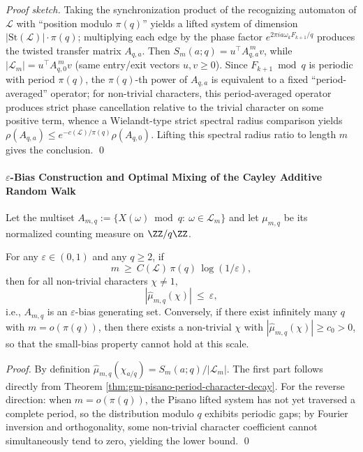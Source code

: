 \begin{proof}[Proof sketch]
Taking the synchronization product of the recognizing automaton of \(\mathcal{L}\) with ``position modulo \(\pi(q)\)'' yields a lifted system of dimension \(|\mathrm{St}(\mathcal{L})|\cdot\pi(q)\); multiplying each edge by the phase factor \(e^{2\pi i a\omega_k F_{k+1}/q}\) produces the twisted transfer matrix \(A_{q,a}\).
Then \(S_m(a;q)=u^\top A_{q,a}^{\,m}v\), while \(|\mathcal{L}_m|=u^\top A_{q,0}^{\,m}v\) (same entry/exit vectors \(u,v\ge 0\)).
Since \(F_{k+1}\bmod q\) is periodic with period \(\pi(q)\), the \(\pi(q)\)-th power of \(A_{q,a}\) is equivalent to a fixed ``period-averaged'' operator; for non-trivial characters, this period-averaged operator produces strict phase cancellation relative to the trivial character on some positive term, whence a Wielandt-type strict spectral radius comparison yields
\(
\rho(A_{q,a})\le e^{-c(\mathcal{L})/\pi(q)}\rho(A_{q,0})
\).
Lifting this spectral radius ratio to length \(m\) gives the conclusion. \qed
\end{proof}

\paragraph{\texorpdfstring{$\varepsilon$}{epsilon}-Bias Construction and Optimal Mixing of the Cayley Additive Random Walk}
Let the multiset
\(
A_{m,q}:=\{X(\omega)\bmod q:\ \omega\in\mathcal{L}_m\}
\)
and let \(\mu_{m,q}\) be its normalized counting measure on \(\ZZ/q\ZZ\).

\begin{proposition}\label{prop:gm-epsilon-bias-pisano-scale}
For any \(\varepsilon\in(0,1)\) and any \(q\ge 2\), if
\[
m\ \ge\ C(\mathcal{L})\,\pi(q)\,\log(1/\varepsilon),
\]
then for all non-trivial characters \(\chi\neq 1\),
\[
|\widehat\mu_{m,q}(\chi)|\ \le\ \varepsilon,
\]
i.e., \(A_{m,q}\) is an \(\varepsilon\)-bias generating set.
Conversely, if there exist infinitely many \(q\) with \(m=o(\pi(q))\), then there exists a non-trivial \(\chi\) with \(|\widehat\mu_{m,q}(\chi)|\ge c_0>0\), so that the small-bias property cannot hold at this scale.
\end{proposition}

\begin{proof}
By definition \(\widehat\mu_{m,q}(\chi_{a/q})=S_m(a;q)/|\mathcal{L}_m|\). The first part follows directly from Theorem \ref{thm:gm-pisano-period-character-decay}.
For the reverse direction: when \(m=o(\pi(q))\), the Pisano lifted system has not yet traversed a complete period, so the distribution modulo \(q\) exhibits periodic gaps; by Fourier inversion and orthogonality, some non-trivial character coefficient cannot simultaneously tend to zero, yielding the lower bound. \qed
\end{proof}

